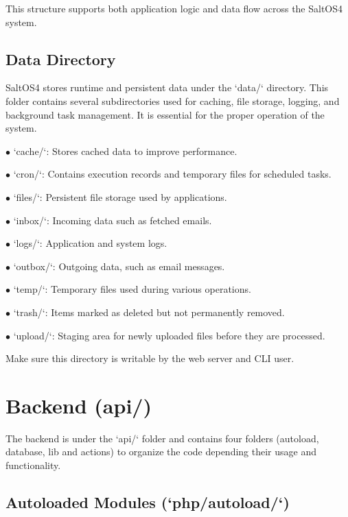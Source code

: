 \documentclass[a4paper]{article}
\begin{document}
This structure supports both application logic and data flow across the SaltOS4 system.

\hypertarget{toc5}{}
\subsection{Data Directory}

SaltOS4 stores runtime and persistent data under the `data/` directory. This folder contains several subdirectories used for caching, file storage, logging, and background task management. It is essential for the proper operation of the system.

\begin{compactitem}
\item[\color{myblue}$\bullet$] `cache/`: Stores cached data to improve performance.
\item[\color{myblue}$\bullet$] `cron/`: Contains execution records and temporary files for scheduled tasks.
\item[\color{myblue}$\bullet$] `files/`: Persistent file storage used by applications.
\item[\color{myblue}$\bullet$] `inbox/`: Incoming data such as fetched emails.
\item[\color{myblue}$\bullet$] `logs/`: Application and system logs.
\item[\color{myblue}$\bullet$] `outbox/`: Outgoing data, such as email messages.
\item[\color{myblue}$\bullet$] `temp/`: Temporary files used during various operations.
\item[\color{myblue}$\bullet$] `trash/`: Items marked as deleted but not permanently removed.
\item[\color{myblue}$\bullet$] `upload/`: Staging area for newly uploaded files before they are processed.
\end{compactitem}

Make sure this directory is writable by the web server and CLI user.


\hypertarget{toc6}{}
\section{Backend (api/)}

The backend is under the `api/` folder and contains four folders (autoload, database, lib and actions) to organize the code depending their usage and functionality.

\hypertarget{toc7}{}
\subsection{Autoloaded Modules (`php/autoload/`)}
\end{document}
